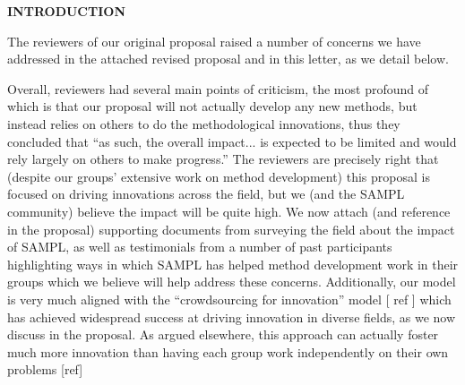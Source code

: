 \documentclass[11pt]{article}
\begin{document}



\begin{centering}
{\bf INTRODUCTION}
\end{centering}

The reviewers of our original proposal raised a number of concerns we have addressed in the attached revised proposal and in this letter, as we detail below.

Overall, reviewers had several main points of criticism, the most profound of which is that our proposal will not actually develop any new methods, but instead relies on others to do the methodological innovations, thus they concluded that ``as such, the overall impact... is expected to be limited and would rely largely on others to make progress.''
The reviewers are precisely right that (despite our groups' extensive work on method development) this proposal is focused on driving innovations across the field, but we (and the SAMPL community) believe the impact will be quite high. 
We now attach (and reference in the proposal) supporting documents from surveying the field about the impact of SAMPL, as well as testimonials from a number of past participants highlighting ways in which SAMPL has helped method development work in their groups which we believe will help address these concerns. 
Additionally, our model is very much aligned with the ``crowdsourcing for innovation'' model [ ref ] which has achieved widespread success at driving innovation in diverse fields, as we now discuss in the proposal. As argued elsewhere, this approach can actually foster much more innovation than having each group work independently on their own problems [ref]
\end{document}

